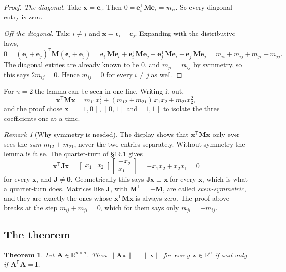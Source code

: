 \documentclass[11pt]{article}
\theoremstyle{plain}
\newtheorem{thm}{Theorem}[section]
\theoremstyle{definition}
\theoremstyle{remark}
\newtheorem*{rmk}{Remark}
\newcommand{\R}{\mathbb{R}}
\newcommand{\vc}[1]{\mathbf{#1}}
\newcommand{\mt}[1]{\mathbf{#1}}
\newcommand{\norm}[1]{\lVert #1\rVert}
\newcommand{\T}{^{\mathsf{T}}}
\begin{document}
\begin{proof}
\emph{The diagonal.} Take $\vc{x}=\vc{e}_i$. Then
$0=\vc{e}_i\T\mt{M}\vc{e}_i=m_{ii}$. So every diagonal entry is zero.

\emph{Off the diagonal.} Take $i\neq j$ and $\vc{x}=\vc{e}_i+\vc{e}_j$.
Expanding with the distributive laws,
\[
  0=(\vc{e}_i+\vc{e}_j)\T\mt{M}(\vc{e}_i+\vc{e}_j)
   =\vc{e}_i\T\mt{M}\vc{e}_i+\vc{e}_i\T\mt{M}\vc{e}_j
    +\vc{e}_j\T\mt{M}\vc{e}_i+\vc{e}_j\T\mt{M}\vc{e}_j
   =m_{ii}+m_{ij}+m_{ji}+m_{jj} .
\]
The diagonal entries are already known to be $0$, and $m_{ji}=m_{ij}$ by
symmetry, so this says $2m_{ij}=0$. Hence $m_{ij}=0$ for every $i\neq j$ as
well.
\end{proof}

\noindent For $n=2$ the lemma can be seen in one line. Writing it out,
\[
  \vc{x}\T\mt{M}\vc{x}=m_{11}x_1^{2}+(m_{12}+m_{21})\,x_1x_2+m_{22}x_2^{2},
\]
and the proof chose $\vc{x}=[\,1,0\,]$, $[\,0,1\,]$ and $[\,1,1\,]$ to isolate
the three coefficients one at a time.

\begin{rmk}[Why symmetry is needed]
The display shows that $\vc{x}\T\mt{M}\vc{x}$ only ever sees the
\emph{sum} $m_{12}+m_{21}$, never the two entries separately. Without symmetry the
lemma is false. The quarter-turn of \S19.1 gives
\[
  \vc{x}\T\mt{J}\vc{x}
  =\begin{bmatrix}x_1&x_2\end{bmatrix}\begin{bmatrix}-x_2\\x_1\end{bmatrix}
  =-x_1x_2+x_2x_1=0
\]
for every $\vc{x}$, and $\mt{J}\neq\mt{0}$. Geometrically this says
$\mt{J}\vc{x}\perp\vc{x}$ for every $\vc{x}$, which is what a quarter-turn does.
Matrices like $\mt{J}$, with $\mt{M}\T=-\mt{M}$, are called
\emph{skew-symmetric}, and they are exactly the ones whose $\vc{x}\T\mt{M}\vc{x}$
is always zero. The proof above breaks at the step $m_{ij}+m_{ji}=0$, which for
them says only $m_{ji}=-m_{ij}$.
\end{rmk}

\subsection{The theorem}
\begin{thm}
\label{thm:lengthpres}
Let $\mt{A}\in\R^{n\times n}$. Then $\norm{\mt{A}\vc{x}}=\norm{\vc{x}}$ for every
$\vc{x}\in\R^{n}$ if and only if $\mt{A}\T\mt{A}=\mt{I}$.
\end{thm}
\end{document}
